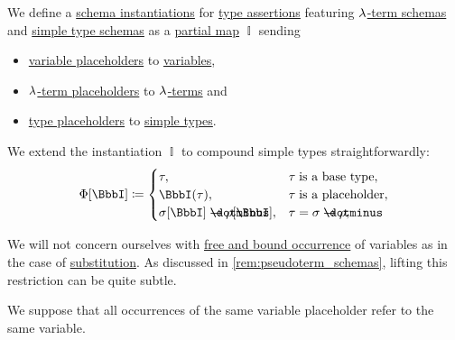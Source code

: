 \begin{definition}\label{def:lambda_schema_instantiation}
  We define a \hyperref[con:schemas_and_instances]{schema instantiations} for \hyperref[def:type_assertion]{type assertions} featuring \hyperref[def:lambda_term_schema]{\( {\mathrm \lambda} \)-term schemas} and \hyperref[def:simple_type_schema]{simple type schemas} as a \hyperref[def:set_valued_map/partial]{partial map} \( \BbbI \) sending
  \begin{itemize}
    \item \hyperref[def:lambda_term_schema]{variable placeholders} to \hyperref[def:lambda_term]{variables},
    \item \hyperref[def:lambda_term_schema]{\( {\mathrm \lambda} \)-term placeholders} to \hyperref[def:lambda_term]{\( {\mathrm \lambda} \)-terms} and
    \item \hyperref[def:simple_type_schema]{type placeholders} to \hyperref[def:simple_type]{simple types}.
  \end{itemize}

  \begin{thmenum}
     We extend the instantiation \( \BbbI \) to compound simple types straightforwardly:
    \begin{equation}\label{eq:def:lambda_schema_instantiation/types}
      \Phi[\BbbI] \coloneqq \begin{cases}
        \tau,                                  &\tau \T{is a base type},        \\
        \BbbI(\tau),                           &\tau \T{is a placeholder},      \\
        \sigma[\BbbI] \synimplies \rho[\BbbI], &\tau = \sigma \synimplies \rho, \\
      \end{cases}
    \end{equation}

     We will not concern ourselves with \hyperref[def:lambda_variable_occurrence]{free and bound occurrence} of variables as in the case of \hyperref[def:lambda_term_substitution]{substitution}. As discussed in \cref{rem:pseudoterm_schemas}, lifting this restriction can be quite subtle.

    We suppose that all occurrences of the same variable placeholder refer to the same variable.


\end{thmenum}
\end{definition}
